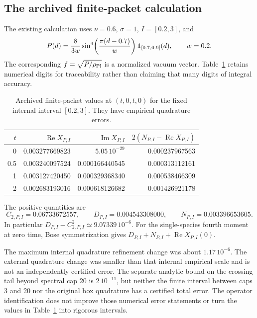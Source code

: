 \subsection{The archived finite-packet calculation}
The existing calculation uses $\nu=0.6$, $\sigma=1$, $I=[0.2,3]$, and
\begin{equation}
 P(d)=\frac{8}{3w}\sin^4\!\left(\frac{\pi(d-0.7)}{w}\right)
             \mathbf 1_{[0.7,0.9]}(d),\qquad w=0.2.
\end{equation}
The corresponding $f=\sqrt{P/\rho_{\mathrm{Pl}}}$ is a normalized vacuum vector.
Table~\ref{tab:fourpoint} retains numerical digits for traceability rather
than claiming that many digits of integral accuracy.
\begin{table}[htbp]
\centering
\begin{tabular}{rrrr}
\toprule
$t$ & $\operatorname{Re}X_{P,I}$ & $\operatorname{Im}X_{P,I}$
    & $2(N_{P,I}-\operatorname{Re}X_{P,I})$\\
\midrule
0   & 0.003277669823 & $5.05\,10^{-29}$ & 0.000237967563\\
0.5 & 0.003240097524 & 0.000166440545 & 0.000313112161\\
1   & 0.003127420450 & 0.000329368340 & 0.000538466309\\
2   & 0.002683193016 & 0.000618126682 & 0.001426921178\\
\bottomrule
\end{tabular}
\caption{Archived finite-packet values at $(t,0,t,0)$ for the fixed
internal interval $[0.2,3]$. They have empirical quadrature errors.}
\label{tab:fourpoint}
\end{table}

The positive quantities are
\begin{equation}
 C_{2,P,I}=0.06733672557,\qquad
 D_{P,I}=0.004543308000,\qquad N_{P,I}=0.003396653605.
\end{equation}
In particular $D_{P,I}-C_{2,P,I}^2\simeq9.07339\,10^{-6}$.
For the single-species fourth moment at zero time, Bose symmetrization
gives $D_{P,I}+N_{P,I}+\operatorname{Re}X_{P,I}(0)$.

The maximum internal quadrature refinement change was about
$1.17\,10^{-6}$. The external quadrature change was smaller than that
internal empirical scale and is not an independently certified error.
The separate analytic bound on the crossing tail beyond spectral cap 20
is $2\,10^{-11}$, but neither the finite interval between caps 3 and 20 nor
the original box quadrature has a certified total error. The operator
identification does not improve those numerical error statements or turn
the values in Table~\ref{tab:fourpoint} into rigorous intervals.
